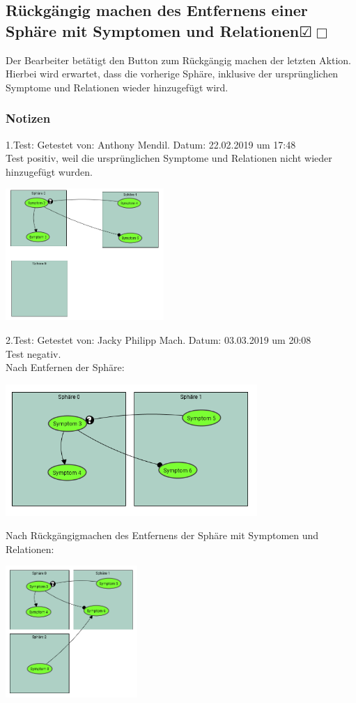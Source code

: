 \documentclass[enabledeprecatedfontcommands]{scrartcl}
\newcommand{\subsectiont}[2]{\subsection[#1]{#1{\normalsize\normalfont #2}}}
\newcommand{\leer}{$\Box$}
\newcommand{\ok}{$\CheckedBox$}
\begin{document}
\subsectiont{Rückgängig machen des Entfernens einer Sphäre mit Symptomen und Relationen}{\dotfill\XBox\ok\leer}
Der Bearbeiter betätigt den Button zum Rückgängig machen der letzten Aktion. Hierbei wird erwartet, dass die vorherige Sphäre, inklusive der ursprünglichen Symptome und Relationen wieder hinzugefügt wird. 
\subsubsection{Notizen}
1.Test: Getestet von: Anthony Mendil. Datum: 22.02.2019 um 17:48 \\
Test positiv, weil die ursprünglichen Symptome und Relationen nicht wieder hinzugefügt wurden. \\
\begin{center}
\includegraphics[height=5cm]{2_11.PNG}
\end{center}
2.Test: Getestet von: Jacky Philipp Mach. Datum: 03.03.2019 um 20:08 \\
Test negativ. \\
Nach Entfernen der Sphäre:
\begin{center}
\includegraphics[height=5cm]{2_11b.png}
\end{center}
Nach Rückgängigmachen des Entfernens der Sphäre mit Symptomen und Relationen:
\begin{center}
\includegraphics[height=5cm]{2_11c.png}
\end{center}
\end{document}
